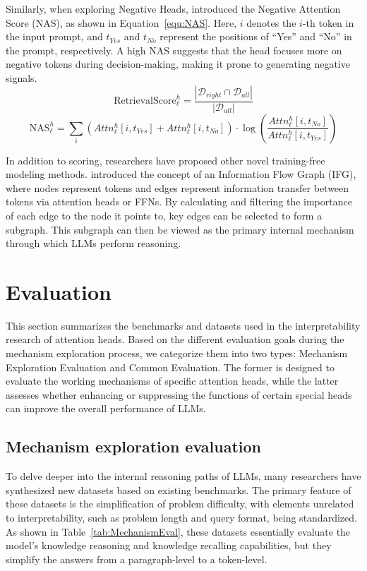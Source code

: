 \documentclass[12pt,letterpaper]{article}
\begin{document}
Similarly, when exploring Negative Heads, \citet{NegativeHead_24_arXiv_SNU} introduced the Negative Attention Score (NAS), as shown in Equation~\ref{equ:NAS}. Here, $i$ denotes the $i$-th token in the input prompt, and $t_{Yes}$ and $t_{No}$ represent the positions of ``Yes'' and ``No'' in the prompt, respectively. A high NAS suggests that the head focuses more on negative tokens during decision-making, making it prone to generating negative signals.
\begin{equation} \label{equ:RetrievalScore}
\text{RetrievalScore}_{\ell}^{h} = \frac{|\mathcal{D}_{right} \cap \mathcal{D}_{all}|}{|\mathcal{D}_{all}|}
\end{equation}
\begin{equation} \label{equ:NAS}
\text{NAS}_{\ell}^{h} = \sum_{i}{\left(Attn_{\ell}^{h}\left[i, t_{Yes}\right] + Attn_{\ell}^{h}\left[i, t_{No}\right]\right) \cdot \log{\left(\frac{Attn_{\ell}^{h}\left[i, t_{No}\right]}{Attn_{\ell}^{h}\left[i, t_{Yes}\right]}\right)}}
\end{equation}

In addition to scoring, researchers have proposed other novel training-free modeling methods.
\citet{InformationFlow_24_arXiv_Meta} introduced the concept of an Information Flow Graph (IFG), where nodes represent tokens and edges represent information transfer between tokens via attention heads or FFNs. By calculating and filtering the importance of each edge to the node it points to, key edges can be selected to form a subgraph. This subgraph can then be viewed as the primary internal mechanism through which LLMs perform reasoning.


\section*{Evaluation} \label{sec:Evaluation}
This section summarizes the benchmarks and datasets used in the interpretability research of attention heads. Based on the different evaluation goals during the mechanism exploration process, we categorize them into two types: Mechanism Exploration Evaluation and Common Evaluation. The former is designed to evaluate the working mechanisms of specific attention heads, while the latter assesses whether enhancing or suppressing the functions of certain special heads can improve the overall performance of LLMs.


\subsection*{Mechanism exploration evaluation}
To delve deeper into the internal reasoning paths of LLMs, many researchers have synthesized new datasets based on existing benchmarks. The primary feature of these datasets is the simplification of problem difficulty, with elements unrelated to interpretability, such as problem length and query format, being standardized. As shown in Table~\ref{tab:MechanismEval}, these datasets essentially evaluate the model's knowledge reasoning and knowledge recalling capabilities, but they simplify the answers from a paragraph-level to a token-level.
\end{document}
